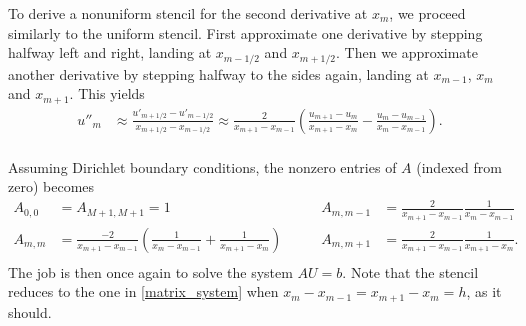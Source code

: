 To derive a nonuniform stencil for the second derivative at $x_m$, we proceed similarly to the uniform stencil.
First approximate one derivative by stepping halfway left and right, landing at $x_{m-1/2}$ and $x_{m+1/2}$.
Then we approximate another derivative by stepping halfway to the sides again, landing at $x_{m-1}$, $x_{m}$ and $x_{m+1}$.
This yields
\newcommand\nonuniformstencil[4]{\frac{2}{x_{#4}-x_{#2}} \left( \frac{#1_{#4}-#1_{#3}}{x_{#4}-x_{#3}} - \frac{#1_{#3}-#1_{#2}}{x_{#3}-x_{#2}} \right)}
\begin{equation*}
\begin{split}
u''_m &\approx \frac{u'_{m+1/2} - u'_{m-1/2}}{x_{m+1/2}-x_{m-1/2}}
	  \approx \nonuniformstencil{u}{m-1}{m}{m+1}.\\
\end{split}
\label{amr_stencil}
\end{equation*}

\newcommand\hleft{x_m-x_{m-1}}
\newcommand\hright{x_{m+1}-x_m}
\newcommand\hfull{x_{m+1}-x_{m-1}}
Assuming Dirichlet boundary conditions, the nonzero entries of $A$ (indexed from zero) becomes
\begin{equation*}
\begin{aligned}
A_{0,0} &= A_{M+1, M+1} = 1
\qquad
&A_{m,m-1}       &= \frac{2}{\hfull} \frac{1}{\hleft} \\
A_{m,m  }       &= \frac{-2}{\hfull} \left( \frac{1}{\hleft} + \frac{1}{\hright} \right)
\qquad
&A_{m,m+1}       &= \frac{2}{\hfull} \frac{1}{\hright}.\\
\end{aligned}
\end{equation*}
The job is then once again to solve the system $A U = b$.
Note that the stencil reduces to the one in \cref{matrix_system} when $\hleft = \hright = h$, as it should.

